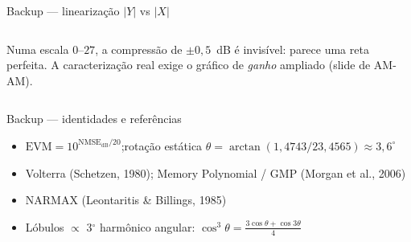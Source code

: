 \documentclass[10pt,aspectratio=169]{beamer}
\begin{document}
\appendix
\begin{frame}{Backup --- linearização $|Y|$ vs $|X|$}
  \begin{columns}[c]
    \footnotesize Numa escala $0$--$27$, a compressão de $\pm0{,}5$~dB é invisível: parece uma reta perfeita. A caracterização real exige o gráfico de \emph{ganho} ampliado (slide de AM-AM).
  \end{columns}
\end{frame}

\begin{frame}{Backup --- identidades e referências}
  \footnotesize
  \begin{itemize}\setlength\itemsep{4pt}
    \item $\text{EVM}=10^{\text{NMSE}_{\text{dB}}/20}$;\quad rotação estática $\theta=\arctan(1{,}4743/23{,}4565)\approx3{,}6^\circ$
    \item Volterra (Schetzen, 1980); Memory Polynomial / GMP (Morgan et al., 2006)
    \item NARMAX (Leontaritis \& Billings, 1985)
    \item Lóbulos $\propto$ 3$^\circ$ harmônico angular: $\cos^3\theta=\tfrac{3\cos\theta+\cos3\theta}{4}$
  \end{itemize}
\end{frame}
\end{document}
